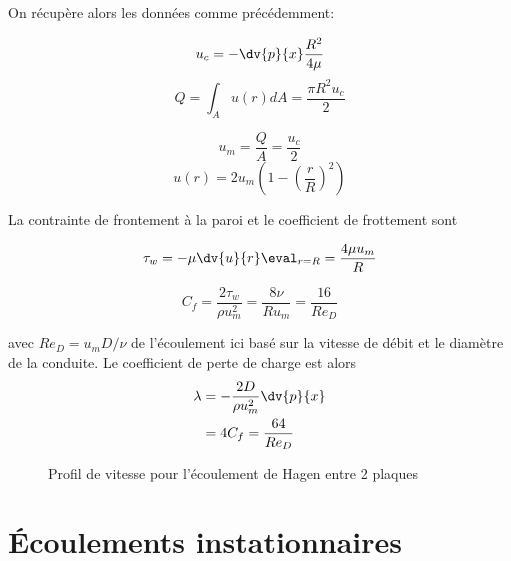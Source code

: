         On récupère alors les données comme précédemment:
        \begin{multicols}{2}
          \begin{equation*}
            u_c = -\dv{p}{x} \frac{R^2}{4\mu}
          \end{equation*}
          \begin{equation*}
            Q = \int_A u(r)dA = \frac{\pi R^2 u_c}{2}
          \end{equation*}

          \begin{equation*}
            u_m = \frac{Q}{A} = \frac{u_c}{2}
          \end{equation*}
          \begin{equation}
            u(r) = 2 u_m \left(1 - \left(\frac{r}{R}\right)^2\right)
          \end{equation}
        \end{multicols}
        La contrainte de frontement à la paroi et le coefficient de frottement sont
        \begin{multicols}{2}
          \begin{equation*}
            \tau_w = -\mu \dv{u}{r}\eval_{r=R} = \frac{4\mu u_m}{R}
          \end{equation*}

          \begin{equation*}
              C_f = \frac{2 \tau_w}{\rho u_m^2} = \frac{8\nu}{R u_m} = \frac{16}{Re_D}
          \end{equation*}
        \end{multicols}
        avec $Re_D = u_m D/\nu$ de l'écoulement ici basé sur la vitesse de débit et le diamètre de la conduite. Le coefficient de perte de charge est alors
        \begin{equation}
          \begin{aligned}
            \lambda &= - \frac{2D}{\rho u_m^2} \dv{p}{x}\\
            &= 4 C_f = \frac{64}{Re_D}
          \end{aligned}
        \end{equation}

        \begin{figure}[!h]
          \centering
          
          \label{fig:HagenProfile}
          \caption{Profil de vitesse pour l'écoulement de Hagen entre 2 plaques}
        \end{figure}

  \section{Écoulements instationnaires}
